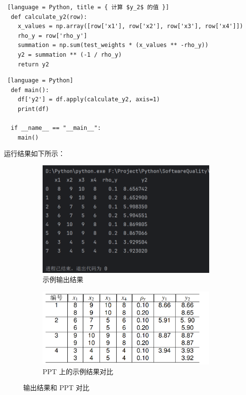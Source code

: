 \begin{lstlisting} [language = Python, title = { 计算 $y_2$ 的值 }]
  def calculate_y2(row):
    x_values = np.array([row['x1'], row['x2'], row['x3'], row['x4']])
    rho_y = row['rho_y']
    summation = np.sum(test_weights * (x_values ** -rho_y))
    y2 = summation ** (-1 / rho_y)
    return y2
\end{lstlisting}

\begin{lstlisting} [language = Python]
  def main():
    df['y2'] = df.apply(calculate_y2, axis=1)
    print(df)

  if __name__ == "__main__":
    main()
\end{lstlisting}

运行结果如下所示：

\begin{figure}[H]
  \centering
  \begin{subfigure}[b]{0.4\textwidth}
    \centering
    \includegraphics[width=\textwidth]{img6/resulttest.png}
    \caption{示例输出结果}
  \end{subfigure}
  \hspace{0.1\textwidth}
  \begin{subfigure}[b]{0.4\textwidth}
    \centering
    \includegraphics[width=\textwidth]{img6/contrast.png}
    \caption{PPT 上的示例结果对比}
  \end{subfigure}
  \caption{输出结果和 PPT 对比}
\end{figure}


